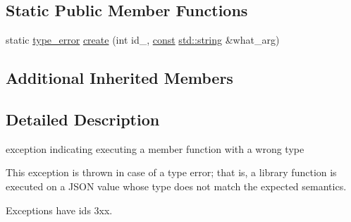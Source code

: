 \subsection*{Static Public Member Functions}
\begin{DoxyCompactItemize}
\item 
static \hyperlink{classnlohmann_1_1detail_1_1type__error}{type\+\_\+error} \hyperlink{classnlohmann_1_1detail_1_1type__error_aecc083aea4b698c33d042670ba50c10f}{create} (int id\+\_\+, \hyperlink{functions__c_8js_afacfd9c985d225bb07483b887a801b6f}{const} \hyperlink{namespacenlohmann_1_1detail_a1ed8fc6239da25abcaf681d30ace4985ab45cffe084dd3d20d928bee85e7b0f21}{std\+::string} \&what\+\_\+arg)
\end{DoxyCompactItemize}
\subsection*{Additional Inherited Members}


\subsection{Detailed Description}
exception indicating executing a member function with a wrong type 

This exception is thrown in case of a type error; that is, a library function is executed on a J\+S\+ON value whose type does not match the expected semantics.

Exceptions have ids 3xx.


